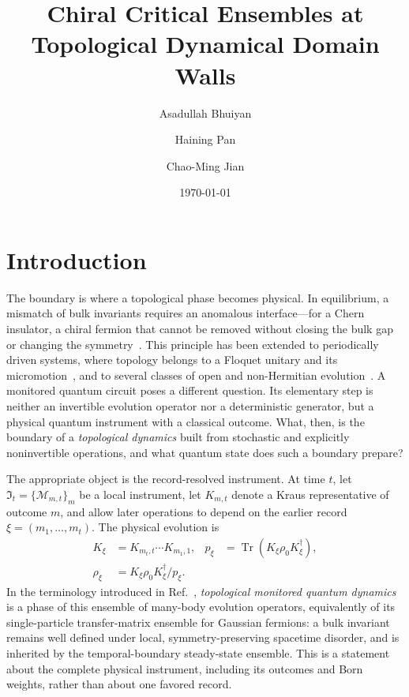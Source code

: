 \documentclass[aps,prl,twocolumn,nofootinbib,superscriptaddress]{revtex4-2}
\newcommand{\Tr}{\operatorname{Tr}}
\newcommand{\cM}{\mathcal{M}}
\newcommand{\fI}{\mathfrak{I}}
\begin{document}
\title{Chiral Critical Ensembles at Topological Dynamical Domain Walls}

\author{Asadullah Bhuiyan}
\author{Haining Pan}
\author{Chao-Ming Jian}

\date{\today}

\maketitle

\section{Introduction}

The boundary is where a topological phase becomes physical.  In equilibrium, a mismatch of bulk invariants requires an anomalous interface---for a Chern insulator, a chiral fermion that cannot be removed without closing the bulk gap or changing the symmetry~\cite{Hatsugai1993,HasanKane2010}.  This principle has been extended to periodically driven systems, where topology belongs to a Floquet unitary and its micromotion~\cite{Rudner2013}, and to several classes of open and non-Hermitian evolution~\cite{Gong2018,Lieu2020,Altland2021}.  A monitored quantum circuit poses a different question.  Its elementary step is neither an invertible evolution operator nor a deterministic generator, but a physical quantum instrument with a classical outcome.  What, then, is the boundary of a \emph{topological dynamics} built from stochastic and explicitly noninvertible operations, and what quantum state does such a boundary prepare?

The appropriate object is the record-resolved instrument.  At time $t$, let $\fI_t=\{\cM_{m,t}\}_m$ be a local instrument, let $K_{m,t}$ denote a Kraus representative of outcome $m$, and allow later operations to depend on the earlier record $\xi=(m_1,\ldots,m_t)$.  The physical evolution is
\begin{equation}
 \begin{aligned}
 K_\xi&=K_{m_t,t}\cdots K_{m_1,1},
 &p_\xi&=\Tr(K_\xi\rho_0K_\xi^\dagger),\\
 \rho_\xi&=K_\xi\rho_0K_\xi^\dagger/p_\xi.&&
 \end{aligned}
 \label{eq:instrument}
\end{equation}
In the terminology introduced in Ref.~\cite{BhuiyanPanJian2026}, \emph{topological monitored quantum dynamics} is a phase of this ensemble of many-body evolution operators, equivalently of its single-particle transfer-matrix ensemble for Gaussian fermions: a bulk invariant remains well defined under local, symmetry-preserving spacetime disorder, and is inherited by the temporal-boundary steady-state ensemble.  This is a statement about the complete physical instrument, including its outcomes and Born weights, rather than about one favored record.
\end{document}
